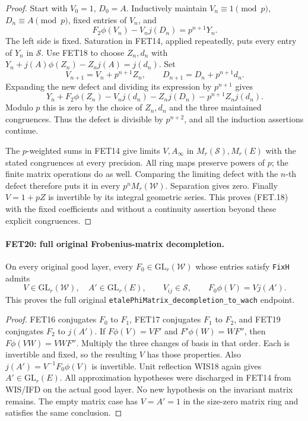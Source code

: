\begin{proof}
Start with $V_0=1$, $D_0=A$. Inductively maintain
$V_n\equiv1\pmod p$, $D_n\equiv A\pmod p$, fixed entries
of $V_n$, and
\[
 F_2\phi(V_n)-V_nj(D_n)=p^{n+1}Y_n.
\]
The left side is fixed. Saturation in FET14, applied repeatedly,
puts every entry of $Y_n$ in $\mathcal S$. Use FET18 to choose
$Z_n,d_n$ with
$Y_n+j(A)\phi(Z_n)-Z_nj(A)=j(d_n)$.
Set
\[
 V_{n+1}=V_n+p^{n+1}Z_n,\qquad
 D_{n+1}=D_n+p^{n+1}d_n.
\]
Expanding the new defect and dividing its expression by
$p^{n+1}$ gives
\[
 Y_n+F_2\phi(Z_n)-V_nj(d_n)-Z_nj(D_n)
                                  -p^{n+1}Z_nj(d_n).
\]
Modulo $p$ this is zero by the choice of $Z_n,d_n$ and the
three maintained congruences. Thus the defect is divisible by
$p^{n+2}$, and all the induction assertions continue.

The $p$-weighted sums in FET14 give limits $V,A_\infty$ in
$M_r(\mathcal S),M_r(E)$ with the stated congruences at every
precision. All ring maps preserve powers of $p$; the finite
matrix operations do as well. Comparing the limiting defect
with the $n$-th defect therefore puts it in every
$p^nM_r(\mathcal W)$. Separation gives zero.
Finally $V=1+pZ$ is invertible by its integral geometric
series. This proves (FET.18) with the fixed coefficients and
without a continuity assertion beyond these explicit congruences.
\end{proof}

\paragraph{FET20: full original Frobenius-matrix decompletion.}
\label{claim:FET20}
On every original good layer, every
$F_0\in\mathrm{GL}_r(\mathcal W)$ whose entries satisfy
\texttt{FixH} admits
\[
 V\in\mathrm{GL}_r(\mathcal W),\quad A'\in\mathrm{GL}_r(E),
 \qquad V_{ij}\in\mathcal S,\qquad
                          F_0\phi(V)=Vj(A').              \tag{FET.19}
\]
This proves the full original
\texttt{etalePhiMatrix\_decompletion\_to\_wach} endpoint.

\begin{proof}
FET16 conjugates $F_0$ to $F_1$, FET17 conjugates $F_1$ to
$F_2$, and FET19 conjugates $F_2$ to $j(A')$.
If $F\phi(V)=VF'$ and $F'\phi(W)=WF''$, then
$F\phi(VW)=VWF''$. Multiply the three changes of basis in
that order. Each is invertible and fixed, so the resulting $V$
has those properties. Also
$j(A')=V^{-1}F_0\phi(V)$ is invertible. Unit reflection WIS18
again gives $A'\in\mathrm{GL}_r(E)$.
All approximation hypotheses were discharged in FET14 from
WIS/IFD on the actual good layer. No new hypothesis on the
invariant matrix remains. The empty matrix case has $V=A'=1$
in the size-zero matrix ring and satisfies the same conclusion.
\end{proof}

